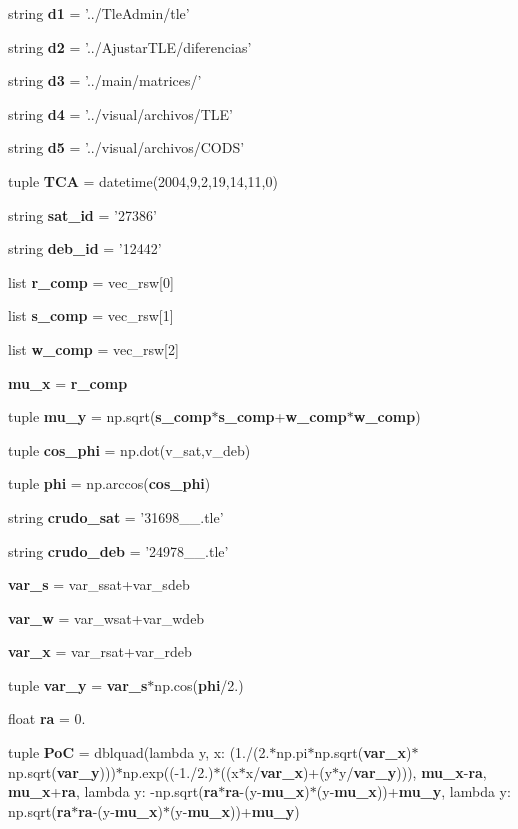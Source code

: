 \begin{DoxyCompactItemize}
\item 
string {\bf d1} = '../\-Tle\-Admin/tle'
\item 
string {\bf d2} = '../\-Ajustar\-T\-L\-E/diferencias'
\item 
string {\bf d3} = '../main/matrices/'
\item 
string {\bf d4} = '../visual/archivos/\-T\-L\-E'
\item 
string {\bf d5} = '../visual/archivos/\-C\-O\-D\-S'
\item 
tuple {\bf \-T\-C\-A} = datetime(2004,9,2,19,14,11,0)
\item 
string {\bf sat\-\_\-id} = '27386'
\item 
string {\bf deb\-\_\-id} = '12442'
\item 
list {\bf r\-\_\-comp} = vec\-\_\-rsw[0]
\item 
list {\bf s\-\_\-comp} = vec\-\_\-rsw[1]
\item 
list {\bf w\-\_\-comp} = vec\-\_\-rsw[2]
\item 
{\bf mu\-\_\-x} = {\bf r\-\_\-comp}
\item 
tuple {\bf mu\-\_\-y} = np.\-sqrt({\bf s\-\_\-comp}$\ast${\bf s\-\_\-comp}+{\bf w\-\_\-comp}$\ast${\bf w\-\_\-comp})
\item 
tuple {\bf cos\-\_\-phi} = np.\-dot(v\-\_\-sat,v\-\_\-deb)
\item 
tuple {\bf phi} = np.\-arccos({\bf cos\-\_\-phi})
\item 
string {\bf crudo\-\_\-sat} = '31698\-\_\-\_.\-tle'
\item 
string {\bf crudo\-\_\-deb} = '24978\-\_\-\_.\-tle'
\item 
{\bf var\-\_\-s} = var\-\_\-ssat+var\-\_\-sdeb
\item 
{\bf var\-\_\-w} = var\-\_\-wsat+var\-\_\-wdeb
\item 
{\bf var\-\_\-x} = var\-\_\-rsat+var\-\_\-rdeb
\item 
tuple {\bf var\-\_\-y} = {\bf var\-\_\-s}$\ast$np.\-cos({\bf phi}/2.)
\item 
float {\bf ra} = 0.
\item 
tuple {\bf \-Po\-C} = dblquad(lambda y, x\-: (1./(2.$\ast$np.\-pi$\ast$np.\-sqrt({\bf var\-\_\-x})$\ast$np.\-sqrt({\bf var\-\_\-y})))$\ast$np.\-exp((-\/1./2.)$\ast$((x$\ast$x/{\bf var\-\_\-x})+(y$\ast$y/{\bf var\-\_\-y}))), {\bf mu\-\_\-x}-\/{\bf ra}, {\bf mu\-\_\-x}+{\bf ra}, lambda y\-: -\/np.\-sqrt({\bf ra}$\ast${\bf ra}-\/(y-\/{\bf mu\-\_\-x})$\ast$(y-\/{\bf mu\-\_\-x}))+{\bf mu\-\_\-y}, lambda y\-: np.\-sqrt({\bf ra}$\ast${\bf ra}-\/(y-\/{\bf mu\-\_\-x})$\ast$(y-\/{\bf mu\-\_\-x}))+{\bf mu\-\_\-y})
\end{DoxyCompactItemize}



